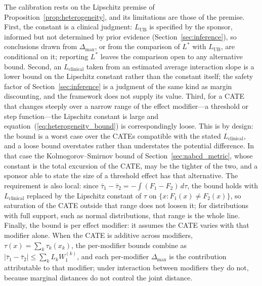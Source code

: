 \documentclass[AMA,Times1COL]{WileyNJDv5}
\begin{document}
The calibration rests on the Lipschitz premise of Proposition~\ref{prop:heterogeneity}, and its limitations are those of the premise. First, the constant is a clinical judgment: $L_{\text{UB}}$ is specified by the sponsor, informed but not determined by prior evidence (Section~\ref{sec:inference}), so conclusions drawn from $\Delta_{\max}$, or from the comparison of $L^*$ with $L_{\text{UB}}$, are conditional on it; reporting $L^*$ leaves the comparison open to any alternative bound. Second, an $L_{\text{clinical}}$ taken from an estimated average interaction slope is a lower bound on the Lipschitz constant rather than the constant itself; the safety factor of Section~\ref{sec:inference} is a judgment of the same kind as margin discounting, and the framework does not supply its value. Third, for a CATE that changes steeply over a narrow range of the effect modifier---a threshold or step function---the Lipschitz constant is large and equation~(\ref{eq:heterogeneity_bound}) is correspondingly loose. This is by design: the bound is a worst case over the CATEs compatible with the stated $L_{\text{clinical}}$, and a loose bound overstates rather than understates the potential difference. In that case the Kolmogorov--Smirnov bound of Section~\ref{sec:nabcd_metric}, whose constant is the total excursion of the CATE, may be the tighter of the two, and a sponsor able to state the size of a threshold effect has that alternative. The requirement is also local: since $\bar{\tau}_1 - \bar{\tau}_2 = -\int (F_1 - F_2)\,d\tau$, the bound holds with $L_{\text{clinical}}$ replaced by the Lipschitz constant of $\tau$ on $\{x : F_1(x) \neq F_2(x)\}$, so saturation of the CATE outside that range does not loosen it; for distributions with full support, such as normal distributions, that range is the whole line. Finally, the bound is per effect modifier: it assumes the CATE varies with that modifier alone. When the CATE is additive across modifiers, $\tau(x) = \sum_k \tau_k(x_k)$, the per-modifier bounds combine as $|\bar{\tau}_1 - \bar{\tau}_2| \leq \sum_k L_k W_1^{(k)}$, and each per-modifier $\Delta_{\max}$ is the contribution attributable to that modifier; under interaction between modifiers they do not, because marginal distances do not control the joint distance.
\end{document}
